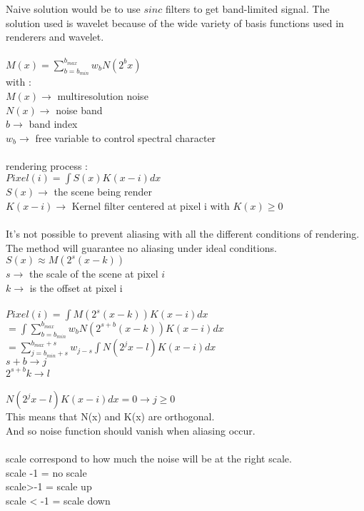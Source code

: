 \documentclass[11pt,a4paper]{article}
\begin{document}
Naive solution would be to use $sinc$ filters to get band-limited signal.
The solution used is wavelet because of the wide variety of basis functions used in renderers and wavelet.
\\\\
$M(x) = \sum\limits_{b=b_{min}}^{b_{max}} w_{b}N(2^{b}x)$
\\
with :
\\
$M(x)\rightarrow$  multiresolution noise
\\
$N(x)\rightarrow$ noise band
\\
$b\rightarrow$ band index
\\
$w_{b}\rightarrow$ free variable to control spectral character
\\
\\
rendering process :
\\
$Pixel(i) = \int S(x)K(x-i)dx$
\\
$S(x)\rightarrow$ the scene being render
\\
$K(x-i)\rightarrow$ Kernel filter centered at pixel i with $K(x) \geq 0$ 
\\
\\
It's not possible to prevent aliasing with all the different conditions of rendering. The method will guarantee no aliasing under ideal conditions.
\\
$S(x)\approx M(2^s(x-k))$
\\
$s\rightarrow$ the scale of the scene at pixel $i$
\\
$k\rightarrow$ is the offset at pixel i
\\\\
$Pixel(i) = \int M(2^s(x-k))K(x-i)dx $ 
\\
$ = \int\sum\limits_{b=b_{min}}^{b_{max}} w_{b}N(2^{s+b}(x-k))K(x-i)dx$
\\
$ = \sum\limits_{j=b_{min}+s}^{b_{max}+s} w_{j-s} \int N(2^{j}x-l)K(x-i)dx $
\\
$s+b\rightarrow j$
\\
$2^{s+b}k\rightarrow l$
\\\\
$N(2^{j}x-l)K(x-i)dx = 0 \rightarrow j\geq0 $
\\
This means that N(x) and K(x) are orthogonal.
\\
And so noise function should vanish when aliasing occur.
\\\\

scale correspond to how much the noise will be at the right scale.
\\
scale -1 = no scale\\
scale>-1 = scale up\\
scale < -1 = scale down
\end{document}
